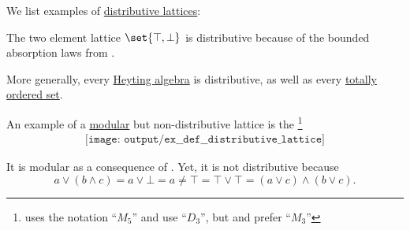 \begin{example}\label{ex:def:distributive_lattice}
  We list examples of \hyperref[def:distributive_lattice]{distributive lattices}:
  \begin{thmenum}
     The two element lattice \( \set{ \top, \bot } \) is distributive because of the bounded absorption laws from .

    More generally, every \hyperref[def:heyting_algebra]{Heyting algebra} is distributive, as well as every \hyperref[def:totally_ordered_set]{totally ordered set}.

     An example of a \hyperref[def:modular_lattice]{modular} but non-distributive lattice is the \footnote{ uses the notation \enquote{\( M_5 \)} and  use \enquote{\( D_3 \)}, but  and  prefer \enquote{\( M_3 \)}}
    \begin{equation}\label{eq:ex:def:distributive_lattice/diamond}\tag{\( M_3 \)}
      \begin{aligned}
        \texttt{[image: output/ex\_\_def\_\_distributive\_lattice]}
      \end{aligned}
    \end{equation}

    It is modular as a consequence of . Yet, it is not distributive because
    \begin{equation*}
      a \vee (b \wedge c) = a \vee \bot = a
      \neq
      \top = \top \vee \top = (a \vee c) \wedge (b \vee c).
    \end{equation*}
  \end{thmenum}
\end{example}


